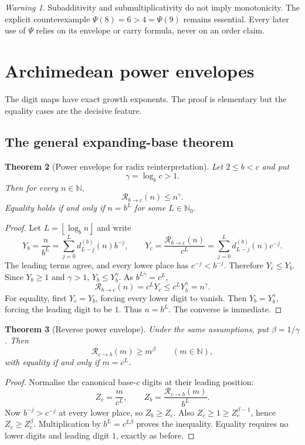 \documentclass[11pt]{article}
\newtheorem{theorem}{Theorem}[section]
\theoremstyle{definition}
\theoremstyle{remark}
\newtheorem{warning}[theorem]{Warning}
\newcommand{\N}{\mathbb N}
\newcommand{\Nzero}{\mathbb N_0}
\newcommand{\floor}[1]{\left\lfloor #1\right\rfloor}
\newcommand{\PsiMap}{\Psi}
\newcommand{\Rad}{\mathcal R}
\begin{document}
\begin{warning}
Subadditivity and submultiplicativity do not imply monotonicity.  The explicit
counterexample $\PsiMap(8)=6>4=\PsiMap(9)$ remains essential.  Every later use
of $\PsiMap$ relies on its envelope or carry formula, never on an order claim.
\end{warning}

\section{Archimedean power envelopes}

The digit maps have exact growth exponents.  The proof is elementary but the
equality cases are the decisive feature.

\subsection{The general expanding-base theorem}

\begin{theorem}[Power envelope for radix reinterpretation]\label{thm:envelope-general}
Let $2\le b<c$ and put
\[
  \gamma=\log_b c>1.
\]
Then for every $n\in\N$,
\[
  \Rad_{b\to c}(n)\le n^\gamma.
\]
Equality holds if and only if $n=b^L$ for some $L\in\Nzero$.
\end{theorem}

\begin{proof}
Let $L=\floor{\log_b n}$ and write
\[
 Y_b=\frac{n}{b^L}
   =\sum_{j=0}^{L}d_{L-j}^{(b)}(n)b^{-j},
 \qquad
 Y_c=\frac{\Rad_{b\to c}(n)}{c^L}
   =\sum_{j=0}^{L}d_{L-j}^{(b)}(n)c^{-j}.
\]
The leading terms agree, and every lower place has $c^{-j}<b^{-j}$.
Therefore $Y_c\le Y_b$.  Since $Y_b\ge1$ and $\gamma>1$,
$Y_b\le Y_b^\gamma$.  As $b^{L\gamma}=c^L$,
\[
 \Rad_{b\to c}(n)=c^LY_c
 \le c^LY_b^\gamma=n^\gamma.
\]
For equality, first $Y_c=Y_b$, forcing every lower digit to vanish.  Then
$Y_b=Y_b^\gamma$, forcing the leading digit to be $1$.  Thus $n=b^L$.
The converse is immediate.
\end{proof}

\begin{theorem}[Reverse power envelope]\label{thm:reverse-envelope}
Under the same assumptions, put $\beta=1/\gamma$.  Then
\[
  \Rad_{c\to b}(m)\ge m^\beta
  \qquad(m\in\N),
\]
with equality if and only if $m=c^L$.
\end{theorem}

\begin{proof}
Normalise the canonical base-$c$ digits at their leading position:
\[
 Z_c=\frac{m}{c^L},\qquad
 Z_b=\frac{\Rad_{c\to b}(m)}{b^L}.
\]
Now $b^{-j}>c^{-j}$ at every lower place, so $Z_b\ge Z_c$.  Also
$Z_c\ge1\ge Z_c^{\beta-1}$, hence $Z_c\ge Z_c^\beta$.  Multiplication by
$b^L=c^{L\beta}$ proves the inequality.  Equality requires no lower digits
and leading digit $1$, exactly as before.
\end{proof}
\end{document}
